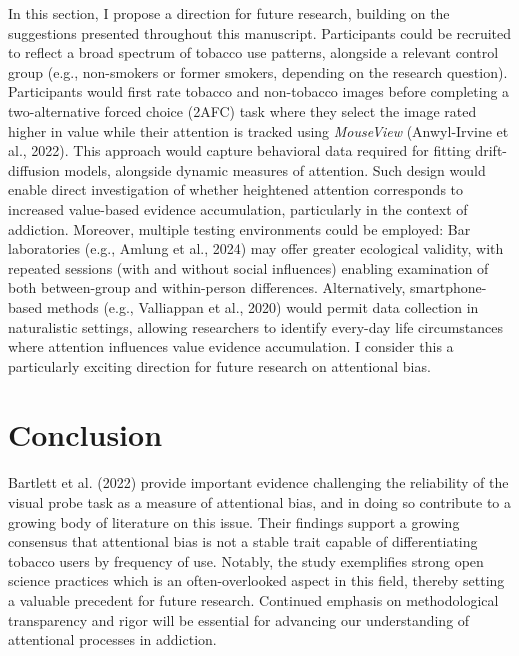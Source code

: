 \documentclass[authordate, empirical]{jote-new-article}
\begin{document}
	In this section, I propose a direction for future research, building on the suggestions presented throughout this manuscript. Participants could be recruited to reflect a broad spectrum of tobacco use patterns, alongside a relevant control group (e.g., non-smokers or former smokers, depending on the research question). Participants would first rate tobacco and non-tobacco images before completing a two-alternative forced choice (2AFC) task where they select the image rated higher in value while their attention is tracked using \emph{MouseView }(Anwyl-Irvine et al., 2022). This approach would capture behavioral data required for fitting drift-diffusion models, alongside dynamic measures of attention. Such design would enable direct investigation of whether heightened attention corresponds to increased value-based evidence accumulation, particularly in the context of addiction. Moreover, multiple testing environments could be employed: Bar laboratories (e.g., Amlung et al., 2024) may offer greater ecological validity, with repeated sessions (with and without social influences) enabling examination of both between-group and within-person differences. Alternatively, smartphone-based methods (e.g., Valliappan et al., 2020) would permit data collection in naturalistic settings, allowing researchers to identify every-day life circumstances where attention influences value evidence accumulation. I consider this a particularly exciting direction for future research on attentional bias.



	\section{Conclusion }



	Bartlett et al. (2022) provide important evidence challenging the reliability of the visual probe task as a measure of attentional bias, and in doing so contribute to a growing body of literature on this issue. Their findings support a growing consensus that attentional bias is not a stable trait capable of differentiating tobacco users by frequency of use. Notably, the study exemplifies strong open science practices which is an often-overlooked aspect in this field, thereby setting a valuable precedent for future research. Continued emphasis on methodological transparency and rigor will be essential for advancing our understanding of attentional processes in addiction.
\end{document}
